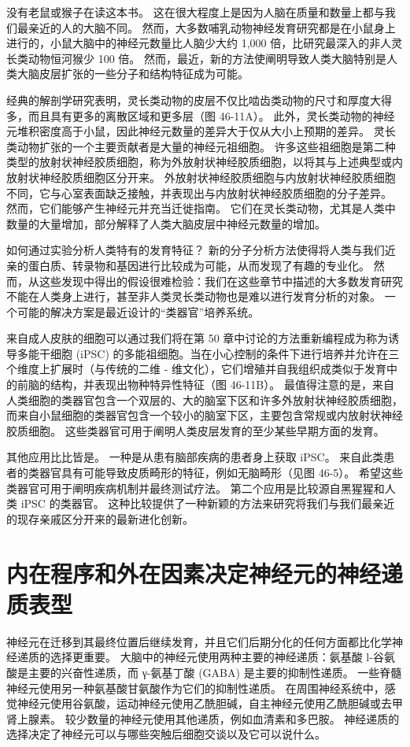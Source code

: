 没有老鼠或猴子在读这本书。 这在很大程度上是因为人脑在质量和数量上都与我们最亲近的人的大脑不同。 然而，大多数哺乳动物神经发育研究都是在小鼠身上进行的，小鼠大脑中的神经元数量比人脑少大约 1,000 倍，比研究最深入的非人灵长类动物恒河猴少 100 倍。 然而，最近，新的方法使阐明导致人类大脑特别是人类大脑皮层扩张的一些分子和结构特征成为可能。

经典的解剖学研究表明，灵长类动物的皮层不仅比啮齿类动物的尺寸和厚度大得多，而且具有更多的离散区域和更多层（图 46-11A）。 此外，灵长类动物的神经元堆积密度高于小鼠，因此神经元数量的差异大于仅从大小上预期的差异。 灵长类动物扩张的一个主要贡献者是大量的神经元祖细胞。 许多这些祖细胞是第二种类型的放射状神经胶质细胞，称为外放射状神经胶质细胞，以将其与上述典型或内放射状神经胶质细胞区分开来。 外放射状神经胶质细胞与内放射状神经胶质细胞不同，它与心室表面缺乏接触，并表现出与内放射状神经胶质细胞的分子差异。 然而，它们能够产生神经元并充当迁徙指南。 它们在灵长类动物，尤其是人类中数量的大量增加，部分解释了人类大脑皮层中神经元数量的增加。

如何通过实验分析人类特有的发育特征？ 新的分子分析方法使得将人类与我们近亲的蛋白质、转录物和基因进行比较成为可能，从而发现了有趣的专业化。 然而，从这些发现中得出的假设很难检验：我们在这些章节中描述的大多数发育研究不能在人类身上进行，甚至非人类灵长类动物也是难以进行发育分析的对象。 一个可能的解决方案是最近设计的“类器官”培养系统。

来自成人皮肤的细胞可以通过我们将在第 50 章中讨论的方法重新编程成为称为诱导多能干细胞 (iPSC) 的多能祖细胞。当在小心控制的条件下进行培养并允许在三个维度上扩展时（与传统的二维 - 维文化），它们增殖并自我组织成类似于发育中的前脑的结构，并表现出物种特异性特征（图 46-11B）。 最值得注意的是，来自人类细胞的类器官包含一个双层的、大的脑室下区和许多外放射状神经胶质细胞，而来自小鼠细胞的类器官包含一个较小的脑室下区，主要包含常规或内放射状神经胶质细胞。 这些类器官可用于阐明人类皮层发育的至少某些早期方面的发育。

其他应用比比皆是。 一种是从患有脑部疾病的患者身上获取 iPSC。 来自此类患者的类器官具有可能导致皮质畸形的特征，例如无脑畸形（见图 46-5）。 希望这些类器官可用于阐明疾病机制并最终测试疗法。 第二个应用是比较源自黑猩猩和人类 iPSC 的类器官。 这种比较提供了一种新颖的方法来研究将我们与我们最亲近的现存亲戚区分开来的最新进化创新。

\section{内在程序和外在因素决定神经元的神经递质表型}
神经元在迁移到其最终位置后继续发育，并且它们后期分化的任何方面都比化学神经递质的选择更重要。 大脑中的神经元使用两种主要的神经递质：氨基酸 l-谷氨酸是主要的兴奋性递质，而 γ-氨基丁酸 (GABA) 是主要的抑制性递质。 一些脊髓神经元使用另一种氨基酸甘氨酸作为它们的抑制性递质。 在周围神经系统中，感觉神经元使用谷氨酸，运动神经元使用乙酰胆碱，自主神经元使用乙酰胆碱或去甲肾上腺素。 较少数量的神经元使用其他递质，例如血清素和多巴胺。 神经递质的选择决定了神经元可以与哪些突触后细胞交谈以及它可以说什么。

